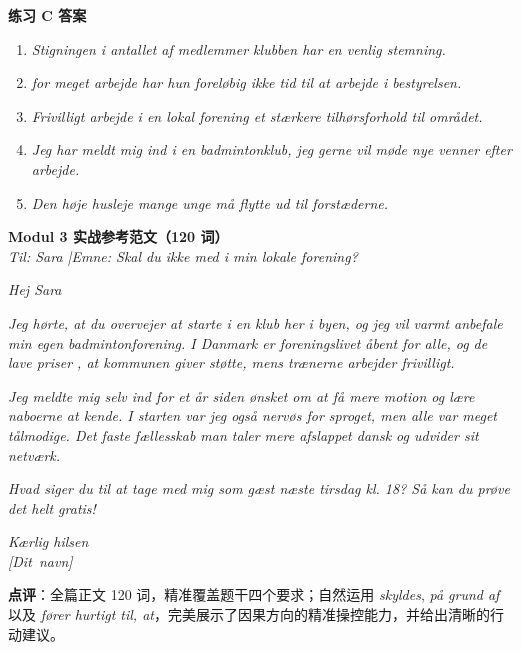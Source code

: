 \begin{answerbox}
\textbf{练习 C 答案}
\begin{enumerate}
  \item \textit{Stigningen i antallet af medlemmer  klubben har en venlig stemning.}
  \item \textit{ for meget arbejde har hun foreløbig ikke tid til at arbejde i bestyrelsen.}
  \item \textit{Frivilligt arbejde i en lokal forening  et stærkere tilhørsforhold til området.}
  \item \textit{Jeg har meldt mig ind i en badmintonklub,  jeg gerne vil møde nye venner efter arbejde.}
  \item \textit{Den høje husleje  mange unge må flytte ud til forstæderne.}
\end{enumerate}

\textbf{Modul 3 实战参考范文（120 词）}\\
\textit{Til: Sara \quad|\quad Emne: Skal du ikke med i min lokale forening?}

\textit{Hej Sara}

\textit{Jeg hørte, at du overvejer at starte i en klub her i byen, og jeg vil varmt anbefale min egen badmintonforening. I Danmark er foreningslivet åbent for alle, og de lave priser , at kommunen giver støtte, mens trænerne arbejder frivilligt.}

\textit{Jeg meldte mig selv ind for et år siden  ønsket om at få mere motion og lære naboerne at kende. I starten var jeg også nervøs for sproget, men alle var meget tålmodige. Det faste fællesskab  man taler mere afslappet dansk og udvider sit netværk.}

\textit{Hvad siger du til at tage med mig som gæst næste tirsdag kl. 18? Så kan du prøve det helt gratis!}

\textit{Kærlig hilsen\\
\mbox{[Dit navn]}}

\small\textbf{点评}：全篇正文 120 词，精准覆盖题干四个要求；自然运用 \textit{skyldes}, \textit{på grund af} 以及 \textit{fører hurtigt til, at}，完美展示了因果方向的精准操控能力，并给出清晰的行动建议。
\end{answerbox}
